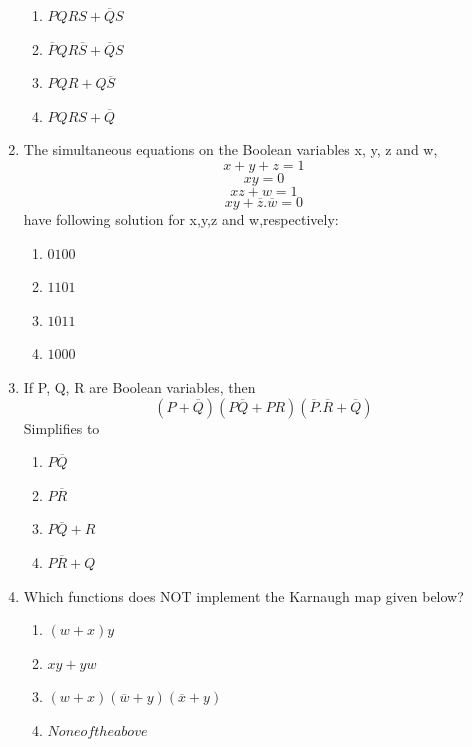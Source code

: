 \documentclass[journal,12pt,twocolumn]{IEEEtran}
\begin{document}
\begin{enumerate}
     \begin{enumerate}
      \item $PQRS+\overline{Q}S$ 
      \item $\overline{P}QR\overline{S}+\overline{Q}S$
      \item $PQR+Q\overline{S}$
      \item $PQRS+\overline{Q}$
    \end{enumerate}
    \item The simultaneous equations on the Boolean variables x, y, z and w,
    $$x+y+z=1$$ $$xy=0$$ $$xz+w=1$$ $$xy+\overline{z}.\overline{w}=0$$
    have following solution for x,y,z and w,respectively:
    \begin{enumerate}
      \item $0 1 0 0$ 
      \item $1 1 0 1$
      \item $1 0 1 1$
      \item $1 0 0 0$
    \end{enumerate}
      \item If P, Q, R are Boolean variables, then $$(P+\overline{Q})(P\overline{Q}+PR)(\overline{P}.\overline{R}+\overline{Q})$$ Simplifies to
      \begin{enumerate}
      \item $P\overline{Q}$ 
      \item $P\overline{R}$
      \item $P\overline{Q}+R$
      \item $P\overline{R}+Q$
    \end{enumerate}
    \item Which functions does NOT implement the Karnaugh map given below?
%

     \begin{enumerate}
      \item $(w+x)y$ 
      \item $xy+yw$
      \item $(w+x)(\overline{w}+y)(\overline{x}+y)$
      \item $None of the above$
    \end{enumerate}
    

\end{enumerate}
\end{document}
